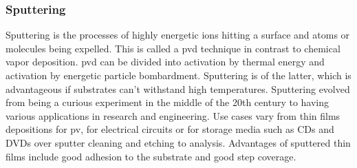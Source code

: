 \subsubsection{Sputtering}
Sputtering is the processes of highly energetic ions hitting a surface and atoms or molecules being expelled. 
This is called a \gls{pvd} technique in contrast to chemical vapor deposition. 
\Gls{pvd} can be divided into activation by thermal energy and activation by energetic particle bombardment. 
Sputtering is of the latter, which 
is advantageous if substrates can't withstand high temperatures.
Sputtering evolved from being a curious experiment in the middle of the 20th century to 
having various applications in research and engineering.
Use cases vary from thin films depositions for \gls{pv}, 
for electrical circuits or for storage media such as CDs and DVDs 
over sputter cleaning and etching to analysis.
Advantages of sputtered thin films include good adhesion to the substrate 
and good step coverage\cite{Swann1988}.

